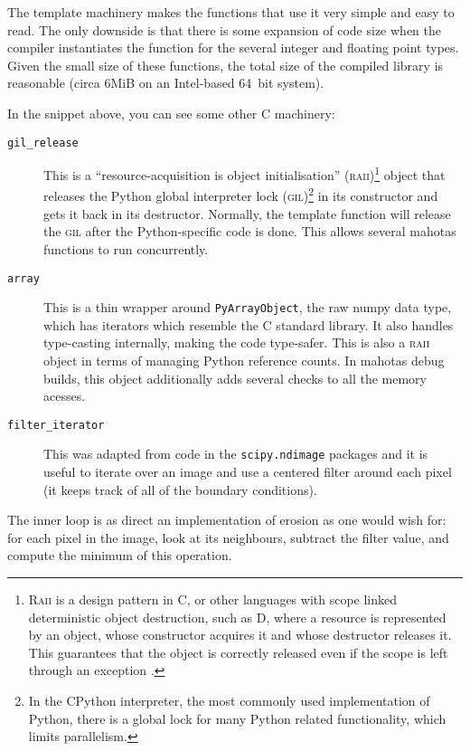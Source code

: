 \documentclass{scrartcl}
\newcommand*{\cpp}{{C\nolinebreak[4]\hspace{-.05em}\raisebox{.4ex}{\tiny\textbf{++}}}}
\let\code\texttt
\begin{document}
The template machinery makes the functions that use it very simple and easy to
read. The only downside is that there is some expansion of code size when the
compiler instantiates the function for the several integer and floating point
types. Given the small size of these functions, the total size of the compiled
library is reasonable (circa 6MiB on an Intel-based 64~bit system).

In the snippet above, you can see some other \cpp{} machinery:

\begin{description}
\item[\code{gil\_release}] This is a ``resource-acquisition is object
initialisation'' (\textsc{raii})\footnote{\textsc{Raii} is a design pattern in
\cpp{}, or other languages with scope linked deterministic object destruction,
such as D, where a resource is represented by an object, whose constructor
acquires it and whose destructor releases it. This guarantees that the object
is correctly released even if the scope is left through an exception
\citep{Stroustrup1994}.} object that releases the Python global interpreter lock
(\textsc{gil})\footnote{In the CPython interpreter, the most commonly used
implementation of Python, there is a global lock for many Python related
functionality, which limits parallelism.} in its constructor and gets it back
in its destructor. Normally, the template function will release the
\textsc{gil} after the Python-specific code is done. This allows several
mahotas functions to run concurrently.
\item[\code{array}] This is a thin wrapper around \code{PyArrayObject}, the raw
numpy data type, which has iterators which resemble the \cpp{} standard
library. It also handles type-casting internally, making the code type-safer.
This is also a \textsc{raii} object in terms of managing Python reference
counts. In mahotas debug builds, this object additionally adds several checks
to all the memory acesses.
\item[\code{filter\_iterator}] This was adapted from code in the
\code{scipy.ndimage} packages and it is useful to iterate over an image and use
a centered filter around each pixel (it keeps track of all of the boundary
conditions).
\end{description}

The inner loop is as direct an implementation of erosion as one would wish for:
for each pixel in the image, look at its neighbours, subtract the filter value,
and compute the minimum of this operation.
\end{document}
